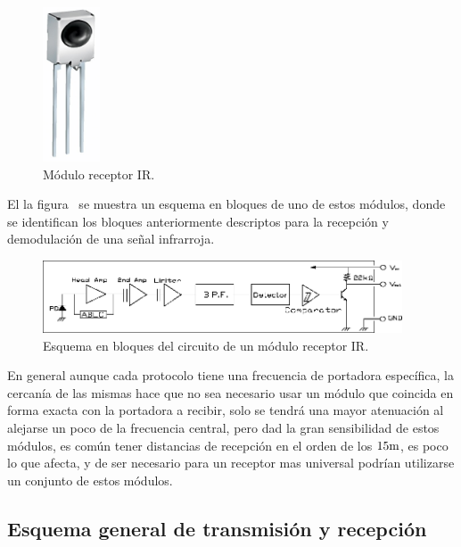 \begin{figure}[H]
	\centering
	\includegraphics[width=0.15\textwidth]{img/IR/IRM86XX.png}
	\caption{\footnotesize{Módulo receptor IR.}}
	\label{fig:IR_Module}
\end{figure}



El la figura~ se muestra un esquema en bloques de uno de estos módulos, donde se identifican los bloques anteriormente descriptos para la recepción y demodulación de una señal infrarroja.


\begin{figure}[H]
	\centering
	\includegraphics[width=0.95\textwidth]{img/IR/IR_module_blocks.png}
	\caption{\footnotesize{Esquema en bloques del circuito de un módulo receptor IR.}}
	\label{fig:IR_Module_sch}
\end{figure}


En general aunque cada protocolo tiene una frecuencia de portadora específica, la cercanía de las mismas hace que no sea necesario usar un módulo que coincida en forma exacta con la portadora a recibir, solo se tendrá una mayor atenuación al alejarse un poco de la frecuencia central, pero dad la gran sensibilidad de estos módulos, es común tener distancias de recepción en el orden de los $15 \si[per-mode=symbol]{\meter}$, es poco lo que afecta, y de ser necesario para un receptor mas universal podrían utilizarse un conjunto de estos módulos.



\subsection{Esquema general de transmisión y recepción}

